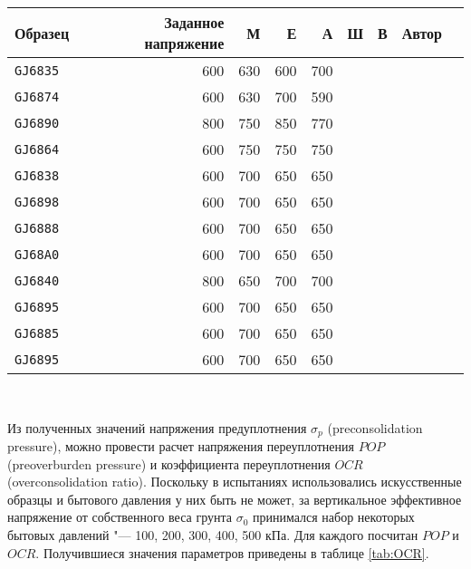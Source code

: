 \begin{table}[]
    \centering
    \caption{} \label{tab:}
    \begin{tabular}{@{}lrrrrrrrr@{}}
    \toprule
    Образец & Заданное напряжение & М & Е & А & Ш & В & Автор &  \\ \midrule
    \texttt{GJ6835}	& 600	& 630	& 600	& 700 &&&& \\
    \texttt{GJ6874}	& 600	& 630	& 700	& 590 &&&& \\
    \texttt{GJ6890}	& 800	& 750	& 850	& 770 &&&& \\
    \texttt{GJ6864}	& 600	& 750	& 750	& 750 &&&& \\
    \texttt{GJ6838} & 600	& 700	& 650	& 650 &&&& \\
    \texttt{GJ6898} & 600	& 700	& 650	& 650 &&&& \\
    \texttt{GJ6888} & 600	& 700	& 650	& 650 &&&& \\
    \texttt{GJ68А0} & 600	& 700	& 650	& 650 &&&& \\
    \texttt{GJ6840} & 800	& 650	& 700	& 700 &&&& \\ 
    \texttt{GJ6895} & 600 & 700 & 650 & 650 &&&& \\
    \texttt{GJ6885} & 600 & 700 & 650 & 650 &&&& \\
    \texttt{GJ6895} & 600 & 700 & 650 & 650 &&&& \\ \midrule
    \bottomrule 
    \end{tabular}
    \\ 
\end{table}

Из полученных значений напряжения предуплотнения $\sigma_p$ (preconsolidation pressure), можно провести расчет напряжения переуплотнения $POP$ (preoverburden pressure) и коэффициента переуплотнения $OCR$ (overconsolidation ratio). Поскольку в испытаниях использовались искусственные образцы и бытового давления у них быть не может, за вертикальное эффективное напряжение от собственного веса грунта $\sigma_0$ принимался набор некоторых бытовых давлений "--- 100, 200, 300, 400, 500 кПа.
Для каждого посчитан $POP$ и $OCR$. Получившиеся значения параметров приведены в таблице \ref{tab:OCR}.

